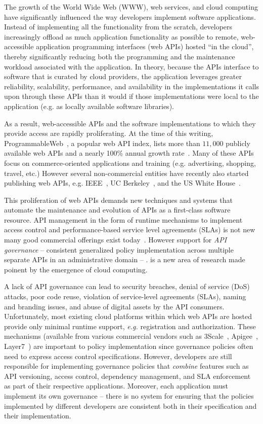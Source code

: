 The growth of the World Wide Web (WWW), web services, and cloud computing have
significantly influenced the way developers implement software applications.
Instead of implementing all the functionality from the scratch, developers
increasingly offload as much application functionality as possible to remote,
web-accessible application programming interfaces (web APIs) hosted ``in the
cloud'', thereby significantly reducing both the programming and
the maintenance workload associated with the application.  In theory, because
the APIs interface to software that is curated by cloud providers, the
application leverages greater
reliability, scalability, performance, 
and availability in the implementations it calls upon through these APIs than
it would if those implementations were local to the application
(e.g. as locally available software libraries).

As a result, web-accessible APIs and the software implementations to which
they provide access are rapidly proliferating.
At the time of this writing, 
ProgrammableWeb~\cite{pweb}, a popular web API index, lists more than $11,000$
publicly available
web APIs and a nearly 100\% annual growth rate~\cite{pweb_growth}. 
Many of these APIs focus on commerce-oriented applications and training (e.g.
advertising, shopping, travel, etc.)
However several non-commercial entities have recently
also started publishing web 
APIs, e.g. IEEE~\cite{ieeeapis}, UC Berkeley~\cite{ucbapis}, and the US White
House~\cite{whitehouseapis}.  

This proliferation of web APIs demands new techniques and systems that
automate the maintenance and evolution of APIs as a first-class software
resource.  API management in the form of runtime mechanisms to implement
access control and performance-based service level agreements (SLAs) is not
new many good commercial offerings exist today~\cite{3scale,apigee,layer7}.   
However support for \textit{API governance} -- consistent generalized policy
implementation across multiple separate APIs in an administrative domain --   .
is a new area of research made poinent by the emergence of cloud computing.

A lack of API governance can lead to 
security breaches, denial of service (DoS)
attacks, poor code reuse, violation of service-level agreements (SLAs), 
naming and branding issues, and abuse of digital 
assets by the API consumers. Unfortunately, most existing cloud platforms
within which web APIs are hosted provide only minimal runtime support, {\em
e.g.}
registration and authorization.  These mechanisms
(available from various commercial vendors such as
3Scale~\cite{3scale}, Apigee~\cite{apigee},
Layer7~\cite{layer7})
are important to policy implementation since governance policies often need to
express access control specifications.  
However, developers are still responsible for implementing governance policies
that {\em combine} features such as API versioning, access control,
dependency management, and SLA enforcement as part of their respective
applications.  Moreover, each application must
implement its own governance -- there is no system for ensuring that the
policies implemented by different developers are consistent both in their
specification and their implementation.

